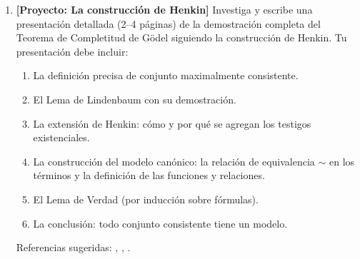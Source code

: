 \begin{enumerate}[leftmargin=2em, label=\textbf{Problema \arabic*.}, itemsep=1em]
  \item \textbf{[Proyecto: La construcción de Henkin]}
  Investiga y escribe una presentación detallada (2--4 páginas) de la demostración completa del Teorema de Completitud de Gödel siguiendo la construcción de Henkin. Tu presentación debe incluir:
  \begin{enumerate}[label=(\alph*)]
    \item La definición precisa de conjunto maximalmente consistente.
    \item El Lema de Lindenbaum con su demostración.
    \item La extensión de Henkin: cómo y por qué se agregan los testigos existenciales.
    \item La construcción del modelo canónico: la relación de equivalencia $\sim$ en los términos y la definición de las funciones y relaciones.
    \item El Lema de Verdad (por inducción sobre fórmulas).
    \item La conclusión: todo conjunto consistente tiene un modelo.
  \end{enumerate}
  Referencias sugeridas: \cite{enderton2001}, \cite{ebbinghaus1994}, \cite{vandalen2013}.

\end{enumerate}
